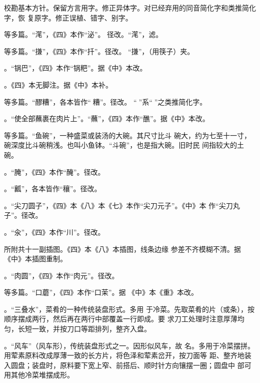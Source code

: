 校勘基本方针。保留方言用字。修正异体字。对已经弃用的同音简化字和类推简化字，恢
复原字。修正误植、错字、别字。

\vspace{.5\baselineskip plus .5\baselineskip minus .5\baselineskip}%
{\noindent\null\hfill{}\hfill\null}%
\vspace{1\baselineskip plus .5\baselineskip minus .5\baselineskip}%

等多篇。“滗”，《四》本作“泌”。
径改。“滗”，滤。

等多篇。“搛”，《四》本作“扦”。径改。
“搛”，（用筷子）夹。

。“锅巴”，《四》本作“锅粑”。据《中》本改。

。《四》本无脚注{\footnotesize{}}。据《中》本补。

等多篇。“醪糟”，各本皆作“𰪿糟”。径改。
“𰪿”系“𫃑”之类推简化字。

。“使全部蘸裹在肉片上”。“蘸”，《四》本作“醮”。据《中》本改。

等多篇。“鱼碗”，一种盛菜或装汤的大碗。其尺寸比斗
碗大，约为七至十一寸，碗深度比斗碗稍浅。也叫小鱼钵。“斗碗”，也是指大碗。旧时民
间指较大的土碗。

。“腌”，《四》本作“醃”。径改。

。“瓤”，各本皆作“穰”。径改。

。“尖刀圆子”，《四》本《八》本《七》本作“尖刀元子”。《中》本
作“尖刀丸子”。径改。

。“汆”，《四》本作“川”。径改。

所附共十一副插图。《四》本《八》本插图，线条边缘
参差不齐模糊不清。据《中》本插图重制。

。“肉圆”，《四》本作“肉元”。径改。

等多篇。“口蘑”，《四》本作“口茉”。据
《中》本《重》本改。

。“三叠水”，菜肴的一种传统装盘形式。多用
于冷菜。先取菜肴的片（或条），按顺序摆成两行，然后再在两行中部覆盖一行即成。要
求刀工处理时注意厚薄均匀，长短一致，并按刀口等距排列，整齐入盘。

。“风车”（风车形），传统装盘形式之一。因形似风车，故
名。多用于冷菜摆拼。用荤素原料改成厚薄一致的长方片，将色泽和荤素岔开，按刀面等
距、整齐地装入圆盘；装盘时，原料要下宽上窄、前搭后、顺时针方向镶摆一圈；圆盘中
部可用其他冷菜堆摆成形。

